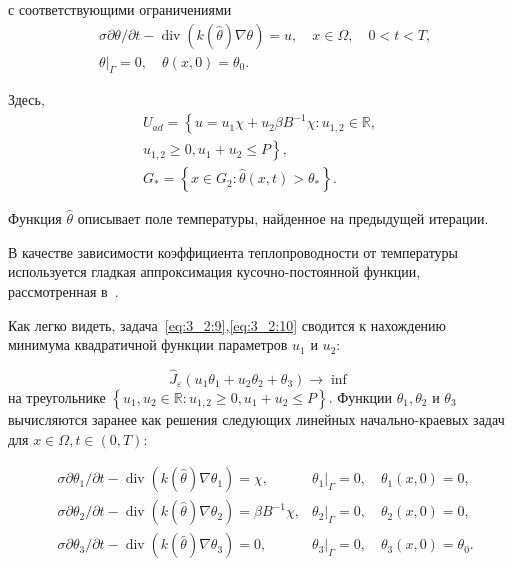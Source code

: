 с соответствующими ограничениями
\begin{equation}
    \label{eq:3_2:10}
    \begin{aligned}
        &\sigma \partial \theta / \partial t-\operatorname{div}(k(\widehat{\theta})
        \nabla \theta)=u, \quad x \in \Omega, \quad 0<t<T, \\
        &\left.\theta\right|_{\Gamma}=0, \quad \theta(x, 0)=\theta_{0}.
    \end{aligned}
\end{equation}

Здесь,
\[
    \begin{gathered}
        U_{a d}=\left\{u=u_{1} \chi+u_{2} \beta B^{-1} \chi: u_{1,2} \in \mathbb{R},\right. \\
        \left.u_{1,2} \geq 0, u_{1}+u_{2} \leq P\right\}, \\
        G_{*}=\left\{x \in G_{2}: \hat{\theta}(x, t)>\theta_{*}\right\}.
    \end{gathered}
\]

Функция $\widehat{\theta}$ описывает поле температуры,
найденное на предыдущей итерации.

В качестве зависимости коэффициента теплопроводности от температуры используется
гладкая аппроксимация кусочно-постоянной функции, рассмотренная
в~\cite{van2014optical, Some_Poluektova2014, Endovenous_Malskat2014}.

Как легко видеть, задача~\eqref{eq:3_2:9},\eqref{eq:3_2:10} сводится к
нахождению минимума квадратичной функции параметров $u_{1}$ и $u_{2}$:

\[
    \widehat{J}_{\varepsilon}\left(u_{1} \theta_{1}+u_{2} \theta_{2}+\theta_{3}\right) \rightarrow \inf
\]
на треугольнике $\left\{u_{1}, u_{2} \in \mathbb{R}:
u_{1,2} \geq 0, u_{1}+u_{2} \leq P\right\}$.
Функции $\theta_{1}, \theta_{2}$ и $\theta_{3}$
вычисляются заранее как решения следующих линейных
начально-краевых задач для $x \in \Omega, t \in(0, T)$:


\[
    \begin{aligned}
        &\sigma \partial \theta_{1} / \partial t-\operatorname{div}\left(k(\widehat{\theta})
        \nabla \theta_{1}\right)=\chi, &
        \left.\theta_{1}\right|_{\Gamma}=0, \quad \theta_{1}(x, 0)=0, \\
        &\sigma \partial \theta_{2} / \partial t-\operatorname{div}\left(k(\widehat{\theta})
        \nabla \theta_{2}\right)=\beta B^{-1} \chi, &
        \left.\theta_{2}\right|_{\Gamma}=0, \quad \theta_{2}(x, 0)=0, \\
        &\sigma \partial \theta_{3} / \partial t-\operatorname{div}\left(k(\widehat{\theta})
        \nabla \theta_{3}\right)=0, &
        \left.\theta_{3}\right|_{\Gamma}=0, \quad \theta_{3}(x, 0)=\theta_{0}.
    \end{aligned}
\]


